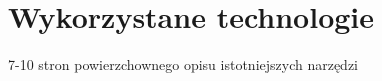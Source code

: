 \chapter{Wykorzystane technologie}
\label{cha:tech-stack}
7-10 stron powierzchownego opisu istotniejszych narzędzi

